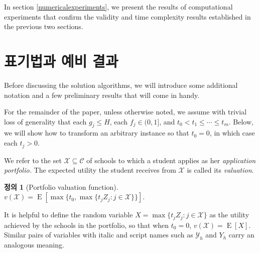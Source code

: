 \documentclass[12pt]{article} %
\newif\ifen
\theoremstyle{definition}
\newtheorem{definition}{Definition}
\theoremstyle{definition}
\newtheorem{definition}{정의}
\begin{document}
In section \ref{numericalexperiments}, we present the results of computational experiments that confirm the validity and time complexity results established in the previous two sections.








\pagebreak
\ifen \section{Notation and preliminary results} \else \section{표기법과 예비 결과}\fi\label{preliminaries}
Before discussing the solution algorithms, we will introduce some additional notation and a few preliminary results that will come in handy.

For the remainder of the paper, unless otherwise noted, we assume with trivial loss of generality that each $g_j \leq H$, each $f_j \in (0, 1]$, and $t_0 < t_1 \leq \cdots \leq t_m$. Below, we will show how to transform an arbitrary instance so that $t_0 = 0$, in which case each $t_j > 0$. 

We refer to the set $\mathcal{X} \subseteq \mathcal{C}$ of schools to which a student applies as her \emph{application portfolio.} The expected utility the student receives from $\mathcal{X}$ is called its \emph{valuation}. %
\begin{definition}[Portfolio valuation function]
$v(\mathcal{X}) =  \operatorname{E}\left[\max\bigr\{t_0,
\max\{t_j Z_j : j \in \mathcal{X}\}\bigr\}\right]$.
\end{definition}
It is helpful to define the random variable $X  = \max\{ t_j Z_j : j \in \mathcal{X}\}$ as the utility achieved by the schools in the portfolio, so that when $t_0 = 0$, $v(\mathcal{X}) = \operatorname{E}[X]$. Similar pairs of variables with italic and script names such as $\mathcal{Y}_h$ and $Y_h$ carry an analogous meaning.
\end{document}

